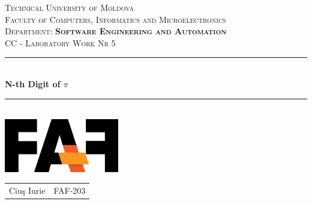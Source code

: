 \documentclass[12pt]{article}
\begin{document}
\newcommand{\HRule}{\rule{\linewidth}{0.2mm}}

\center


\textsc{
    \LARGE Technical University of Moldova
}\\[0cm]

\textsc{
    Faculty of Computers, Informatics and Microelectronics
}\\[0cm]

\textsc{
    Department: \textbf{Software Engineering and Automation}
}\\[4cm]




\textsc{
    \Large CC - Laboratory Work Nr 5
}\\[0cm]




\HRule \\[0.6cm]
{ \huge \bfseries N-th Digit of $\pi$ }\\[0.1cm]
\HRule \\[1.5cm]




{\includegraphics[width=5cm]{logo.PNG}}\\[1cm]




\begin{center}
    \begin{tabular}{ c c }
        Ciuş Iurie & FAF-203
    \end{tabular}
\end{center}

\end{document}
